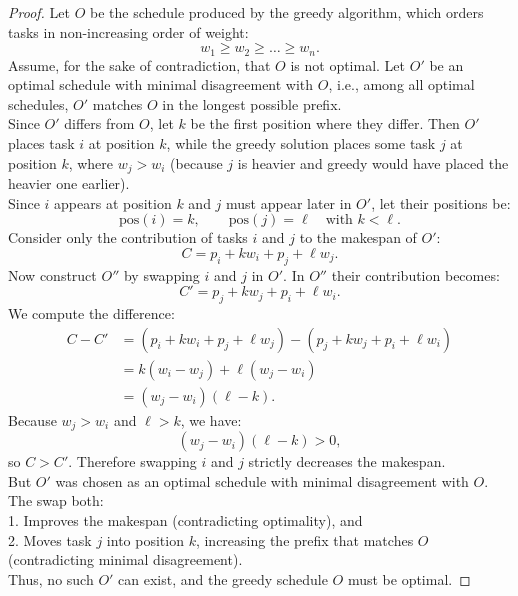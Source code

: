 \documentclass[a4paper,11pt]{article}
\begin{document}
\begin{proof}
    Let $O$ be the schedule produced by the greedy algorithm, which orders tasks in non-increasing order of weight:
    \[
    w_{1} \ge w_{2} \ge \dots \ge w_{n}.
    \]
    Assume, for the sake of contradiction, that $O$ is not optimal. Let $O'$ be an optimal schedule with minimal disagreement with $O$, i.e., among all optimal schedules, $O'$ matches $O$ in the longest possible prefix.\\
    Since $O'$ differs from $O$, let $k$ be the first position where they differ. Then $O'$ places task $i$ at position $k$, while the greedy solution places some task $j$ at position $k$, where $w_j > w_i$ (because $j$ is heavier and greedy would have placed the heavier one earlier).\\
    Since $i$ appears at position $k$ and $j$ must appear later in $O'$, let their positions be:
    \[
    \text{pos}(i) = k, \qquad \text{pos}(j) = \ell \quad \text{with } k < \ell.
    \]
    Consider only the contribution of tasks $i$ and $j$ to the makespan of $O'$:
    \[
    C = p_i + k w_i + p_j + \ell w_j.
    \]
    Now construct $O''$ by swapping $i$ and $j$ in $O'$. In $O''$ their contribution becomes:
    \[
    C' = p_j + k w_j + p_i + \ell w_i.
    \]
    We compute the difference:
    \begin{align*}
    C - C' &= (p_i + k w_i + p_j + \ell w_j)
            - (p_j + k w_j + p_i + \ell w_i) \\
    &= k(w_i - w_j) + \ell(w_j - w_i) \\
    &= (w_j - w_i)(\ell - k).
    \end{align*}
    Because $w_j > w_i$ and $\ell > k$, we have:
    \[
    (w_j - w_i)(\ell - k) > 0,
    \]
    so $C > C'$. Therefore swapping $i$ and $j$ strictly decreases the makespan.\\
    But $O'$ was chosen as an optimal schedule with minimal disagreement with $O$. The swap both:\\
    1. Improves the makespan (contradicting optimality), and\\
    2. Moves task $j$ into position $k$, increasing the prefix that matches $O$ (contradicting minimal disagreement).\\
    Thus, no such $O'$ can exist, and the greedy schedule $O$ must be optimal.
\end{proof}
\end{document}
